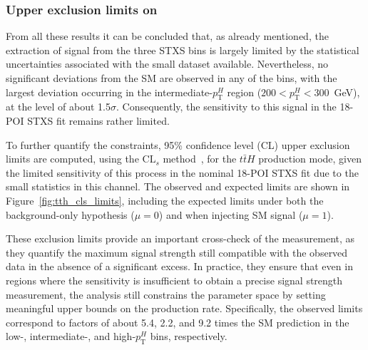 \subsubsection*{Upper exclusion limits on \ttH}
\label{limits}
From all these results it can be concluded that, as already mentioned, the extraction of signal from the three STXS bins is largely limited by the statistical uncertainties associated with the small dataset available. Nevertheless, no significant deviations from the SM are observed in any of the bins, with the largest deviation occurring in the intermediate-$p_{\text{T}}^{H}$ region ($200 < p_{\text{T}}^{H} < 300$~GeV), at the level of about 1.5$\sigma$. Consequently, the sensitivity to this signal in the 18-POI STXS fit remains rather limited.

To further quantify the constraints, 95\% confidence level (CL) upper exclusion limits are computed, using the $\text{CL}_{s}$ method~\cite{JUNK1999435,ALRead_2002}, for the $t\bar{t}H$ production mode, given the limited sensitivity of this process in the nominal 18-POI STXS fit due to the small statistics in this channel. The observed and expected limits are shown in Figure~\ref{fig:tth_cls_limits}, including the expected limits under both the background-only hypothesis ($\mu=0$) and when injecting SM signal ($\mu=1$). 

These exclusion limits provide an important cross-check of the measurement, as they quantify the maximum signal strength still compatible with the observed data in the absence of a significant excess. In practice, they ensure that even in regions where the sensitivity is insufficient to obtain a precise signal strength measurement, the analysis still constrains the parameter space by setting meaningful upper bounds on the production rate. Specifically, the observed limits correspond to factors of about 5.4, 2.2, and 9.2 times the SM prediction in the low-, intermediate-, and high-$p_{\text{T}}^{H}$ bins, respectively. 

